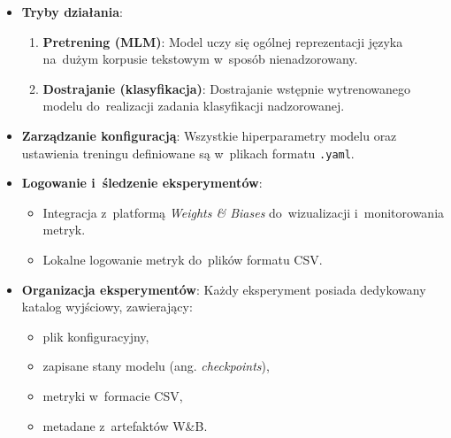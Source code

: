\documentclass[a4paper,11pt,twoside]{report}
\theoremstyle{definition}
\begin{document}
\begin{itemize}
    \item \textbf{Tryby działania}:
    \begin{enumerate}
        \item \textbf{Pretrening (MLM)}: Model uczy się ogólnej reprezentacji języka na~dużym korpusie tekstowym w~sposób nienadzorowany.
        \item \textbf{Dostrajanie (klasyfikacja)}: Dostrajanie wstępnie wytrenowanego modelu do~realizacji zadania klasyfikacji nadzorowanej.
    \end{enumerate}
    
    \item \textbf{Zarządzanie konfiguracją}: Wszystkie hiperparametry modelu oraz ustawienia treningu definiowane są w~plikach formatu \texttt{.yaml}.
    
    \item \textbf{Logowanie i~śledzenie eksperymentów}:
    \begin{itemize}
        \item Integracja z~platformą \textit{Weights \& Biases} do~wizualizacji i~monitorowania metryk.
        \item Lokalne logowanie metryk do~plików formatu CSV.
    \end{itemize}
    
    \item \textbf{Organizacja eksperymentów}: Każdy eksperyment posiada dedykowany katalog wyjściowy, zawierający:
    \begin{itemize}
        \item plik konfiguracyjny,
        \item zapisane stany modelu (ang. \emph{checkpoints}),
        \item metryki w~formacie CSV,
        \item metadane z~artefaktów W\&B.
    \end{itemize}
\end{itemize}
\end{document}

